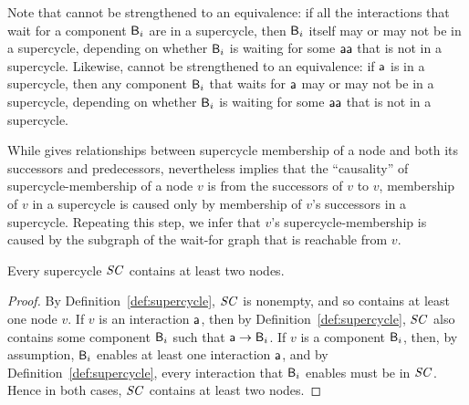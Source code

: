 Note that  cannot be strengthened to an equivalence: if all
the interactions that wait for a component $\mathsf{B}_i$ are in a supercycle, then $\mathsf{B}_i$ itself may or may
not be in a supercycle, depending on whether $\mathsf{B}_i$ is waiting for some $\mathsf{aa}$ that is not in a
supercycle.
%
Likewise,  cannot be strengthened to an equivalence: if $\mathsf{a}$
is in a supercycle, then any component $\mathsf{B}_i$ that waits for $\mathsf{a}$ may or may not be in a 
supercycle, depending on whether $\mathsf{B}_i$ is waiting for some $\mathsf{aa}$ that is not in a supercycle. 




While  gives relationships between supercycle membership of a node and both its
successors and predecessors, nevertheless  implies that the ``causality'' of
supercycle-membership of a node $v$ is from the successors of $v$ to $v$, \ie membership of $v$ in a
supercycle is caused only by membership of $v$'s successors in a supercycle. Repeating this step, we
infer that $v$'s supercycle-membership is caused by the subgraph of the wait-for graph that is
reachable from $v$.







\begin{proposition} \label{prop:supercycle:contains-twoNodes}
Every supercycle $\mathit{SC}$ contains at least two nodes.
\end{proposition} 

\begin{proof}
By Definition~\ref{def:supercycle}, $\mathit{SC}$ is nonempty, and so contains at least one node $v$.
If $v$ is an interaction $\mathsf{a}$, then by Definition~\ref{def:supercycle}, $\mathit{SC}$ also contains some component $\mathsf{B}_i$ such that 
$\mathsf{a} \rightarrow \mathsf{B}_i$. 
If $v$ is a  component $\mathsf{B}_i$, then, by assumption, $\mathsf{B}_i$ enables at least one interaction $\mathsf{a}$, and by 
Definition~\ref{def:supercycle}, every interaction that $\mathsf{B}_i$ enables must be in $\mathit{SC}$.
Hence in both cases, $\mathit{SC}$ contains at least two nodes.
\end{proof}


